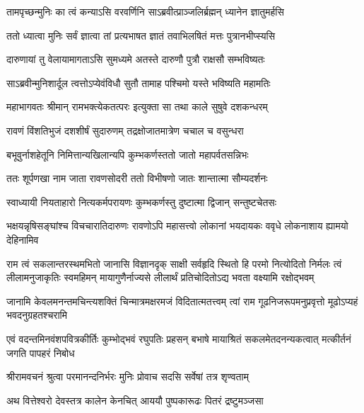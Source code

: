 \twolineshloka
{तामपृच्छन्मुनिः का त्वं कन्याऽसि वरवर्णिनि}
{साऽब्रवीत्प्राञ्जलिर्ब्रह्मन् ध्यानेन ज्ञातुमर्हसि} %

\twolineshloka
{ततो ध्यात्वा मुनिः सर्वं ज्ञात्वा तां प्रत्यभाषत}
{ज्ञातं तवाभिलषितं मत्तः पुत्रानभीप्स्यसि} %

\twolineshloka
{दारुणायां तु वेलायामागताऽसि सुमध्यमे}
{अतस्ते दारुणौ पुत्रौ राक्षसौ सम्भविष्यतः} %

\twolineshloka
{साऽब्रवीन्मुनिशार्दूल त्वत्तोऽप्येवंविधौ सुतौ}
{तामाह पश्चिमो यस्ते भविष्यति महामतिः} %

\twolineshloka
{महाभागवतः श्रीमान् रामभक्त्येकतत्परः}
{इत्युक्ता सा तथा काले सुषुवे दशकन्धरम्} %

\twolineshloka
{रावणं विंशतिभुजं दशशीर्षं सुदारुणम्}
{तद्रक्षोजातमात्रेण चचाल च वसुन्धरा} %

\twolineshloka
{बभूवुर्नाशहेतूनि निमित्तान्यखिलान्यपि}
{कुम्भकर्णस्ततो जातो महापर्वतसन्निभः} %

\twolineshloka
{ततः शूर्पणखा नाम जाता रावणसोदरी}
{ततो विभीषणो जातः शान्तात्मा सौम्यदर्शनः} %

\twolineshloka
{स्वाध्यायी नियताहारो नित्यकर्मपरायणः}
{कुम्भकर्णस्तु दुष्टात्मा द्विजान् सन्तुष्टचेतसः} %

\threelineshloka
{भक्षयन्नृषिसङ्घांश्च विचचारातिदारुणः}
{रावणोऽपि महासत्त्वो लोकानां भयदायकः}
{ववृधे लोकनाशाय ह्यामयो देहिनामिव} %

\fourlineindentedshloka
{राम त्वं सकलान्तरस्थमभितो जानासि विज्ञानदृक्}
{साक्षी सर्वहृदि स्थितो हि परमो नित्योदितो निर्मलः}
{त्वं लीलामनुजाकृतिः स्वमहिमन् मायागुणैर्नाज्यसे}
{लीलार्थं प्रतिचोदितोऽद्य भवता वक्ष्यामि रक्षोद्भवम्} %

\fourlineindentedshloka
{जानामि केवलमनन्तमचिन्त्यशक्तिं}
{चिन्मात्रमक्षरमजं विदितात्मतत्त्वम्}
{त्वां राम गूढनिजरूपमनुप्रवृत्तो}
{मूढोऽप्यहं भवदनुग्रहतश्चरामि} %

\fourlineindentedshloka
{एवं वदन्तमिनवंशपवित्रकीर्तिः}
{कुम्भोद्भवं रघुपतिः प्रहसन् बभाषे}
{मायाश्रितं सकलमेतदनन्यकत्वात्}
{मत्कीर्तनं जगति पापहरं निबोध} %






\twolineshloka
{श्रीरामवचनं श्रुत्वा परमानन्दनिर्भरः}
{मुनिः प्रोवाच सदसि सर्वेषां तत्र शृण्वताम्} %

\twolineshloka
{अथ वित्तेश्वरो देवस्तत्र कालेन केनचित्}
{आययौ पुष्पकारूढः पितरं द्रष्टुमञ्जसा} %

